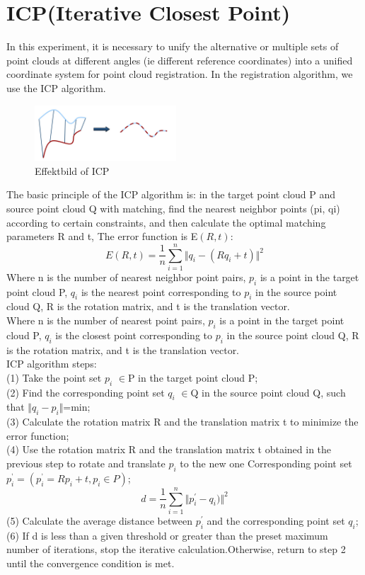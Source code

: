 \section{ICP(Iterative Closest Point)}
In this experiment, it is necessary to unify the alternative or multiple sets of point clouds at different angles (ie different reference coordinates) into a unified coordinate system for point cloud registration. In the registration algorithm, we use the ICP algorithm.\\
\begin{figure}[htp]
	\centering %
	\includegraphics[width = 5.3cm]{figures/icp}
	\caption{ Effektbild of ICP}
	\label{fig:figure1label}
\end{figure}
The basic principle of the ICP algorithm is: in the target point cloud P and source point cloud Q with matching, find the nearest neighbor points (pi, qi) according to certain constraints, and then calculate the optimal matching parameters R and t, The error function is E$\left(R,t\right)$:
$$E\left(R,t\right)=\frac 1n\sum_{i=1}^n \Vert q_i-(Rq_i+t)\Vert^2$$
Where n is the number of nearest neighbor point pairs, $p_i$ is a point in the target point cloud P, $q_i$ is the nearest point corresponding to $p_i$ in the source point cloud Q, R is the rotation matrix, and t is the translation vector.\\

Where n is the number of nearest point pairs, $p_i$ is a point in the target point cloud P, $q_i$ is the closest point corresponding to $p_i$ in the source point cloud Q, R is the rotation matrix, and t is the translation vector.\\

ICP algorithm steps:\\
(1) Take the point set $p_i$ $\in$P in the target point cloud P;\\
(2) Find the corresponding point set $q_i$ $\in$Q in the source point cloud Q, such that $\Vert q_i-p_i\Vert$=min;\\
(3) Calculate the rotation matrix R and the translation matrix t to minimize the error function;\\
(4) Use the rotation matrix R and the translation matrix t obtained in the previous step to rotate and translate $p_i$ to the new one Corresponding point set $p_{i}^{’}=(p_{i}^{’}=Rp_{i}+t,p_{i} \in P)$;\\$$d=\frac 1n\sum_{i=1}^n \Vert p_{i}^{'}-q_i)\Vert^2$$
(5) Calculate the average distance between $p_{i}^{'}$ and the corresponding point set $q_{i}$;\\
(6) If d is less than a given threshold or greater than the preset maximum number of iterations, stop the iterative calculation.Otherwise, return to step 2 until the convergence condition is met.\\


